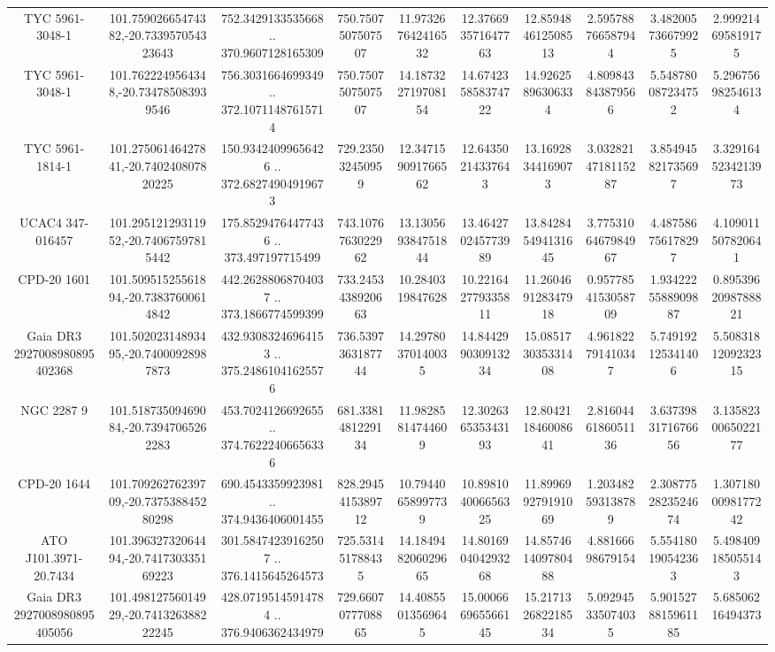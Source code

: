 \begin{table}
\begin{tabular}{cccccccccc}
TYC 5961-3048-1 & 101.75902665474382,-20.733957054323643 & 752.3429133535668 .. 370.9607128165309 & 750.7507507507507 & 11.973267642416532 & 12.376693571647763 & 12.859484612508513 & 2.595788766587944 & 3.482005736679925 & 2.999214695819175 \\
TYC 5961-3048-1 & 101.7622249564348,-20.734785083939546 & 756.3031664699349 .. 372.10711487615714 & 750.7507507507507 & 14.187322719708154 & 14.674235858374722 & 14.92625896306334 & 4.809843843879566 & 5.548780087234752 & 5.296756982546134 \\
TYC 5961-1814-1 & 101.27506146427841,-20.740240807820225 & 150.93424099656426 .. 372.68274904919673 & 729.235032450959 & 12.347159091766562 & 12.64350214337643 & 13.16928344169073 & 3.0328214718115287 & 3.854945821735697 & 3.3291645234213973 \\
UCAC4 347-016457 & 101.29512129311952,-20.74067597815442 & 175.85294764477436 .. 373.497197715499 & 743.1076763022962 & 13.130569384751844 & 13.464270245773989 & 13.842845494131645 & 3.7753106467984967 & 4.487586756178297 & 4.109011507820641 \\
CPD-20  1601 & 101.50951525561894,-20.73837600614842 & 442.26288068704037 .. 373.1866774599399 & 733.2453438920663 & 10.2840319847628 & 10.221642779335811 & 11.260469128347918 & 0.9577854153058709 & 1.9342225588909887 & 0.8953962098788821 \\
Gaia DR3 2927008980895402368 & 101.50202314893495,-20.74000928987873 & 432.93083246964153 .. 375.24861041625576 & 736.5397363187744 & 14.29780370140035 & 14.844299030913234 & 15.085173035331408 & 4.961822791410347 & 5.749192125341406 & 5.5083181209232315 \\
NGC  2287     9 & 101.51873509469084,-20.73947065262283 & 453.7024126692655 .. 374.76222406656336 & 681.3381481229134 & 11.98285814744609 & 12.302636535343193 & 12.804211846008641 & 2.8160446186051136 & 3.6373983171676656 & 3.1358230065022177 \\
CPD-20  1644 & 101.70926276239709,-20.737538845280298 & 690.4543359923981 .. 374.9436406001455 & 828.2945415389712 & 10.79440658997739 & 10.898104006656325 & 11.899699279191069 & 1.203482593138789 & 2.3087752823524674 & 1.3071800098177242 \\
ATO J101.3971-20.7434 & 101.39632732064494,-20.741730335169223 & 301.58474239162507 .. 376.1415645264573 & 725.531451788435 & 14.184948206029665 & 14.801690404293268 & 14.857461409780488 & 4.88166698679154 & 5.554180190542363 & 5.498409185055143 \\
Gaia DR3 2927008980895405056 & 101.49812756014929,-20.741326388222245 & 428.07195145914784 .. 376.9406362434979 & 729.6607077708865 & 14.40855013569645 & 15.000666965566145 & 15.217132682218534 & 5.092945335074035 & 5.9015278815961185 & 5.68506216494373 \\

\end{tabular}
\end{table}
